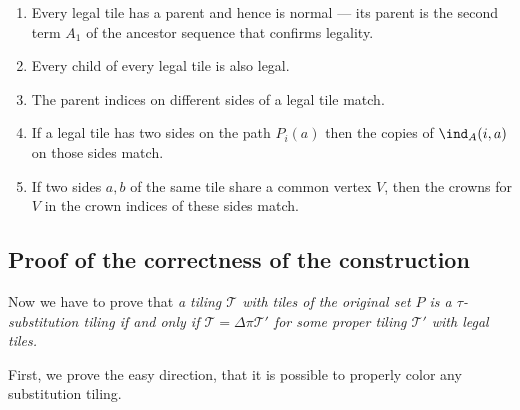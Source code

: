 \documentclass[12pt]{article}
\theoremstyle{remark}
\begin{document}
\renewcommand{\labelenumi}{S\theenumi:}
\begin{enumerate}
\item Every legal tile has a parent and hence is  normal --- its parent is 
the second term $A_1$ of the
ancestor sequence that confirms legality.
\label{s1}
\item Every child of every legal tile is also legal.\label{s3}
\item The parent indices on different sides of a legal tile
match. \label{s2}
\item
If a legal tile has two sides on the path $P_i(a)$
then the copies of  $\ind_A(i,a)$
on those sides 
match.\label{s6}
\item
If two sides $a,b$ of the same tile share a common vertex $V$, then the crowns for $V$
in the crown indices of these sides match.\label{s7}
\end{enumerate}











\subsection{Proof of the correctness of the construction}
Now we have to prove that  \emph{a tiling $\mathcal T$ with tiles of the original set $P$ is 
a $\tau$-substitution tiling if and only if $\mathcal T=\Delta\pi\mathcal T'$ for some proper tiling
$\mathcal T'$ with legal tiles.}

First, we prove the easy direction, that it is possible
to properly color any substitution tiling.
\end{document}
